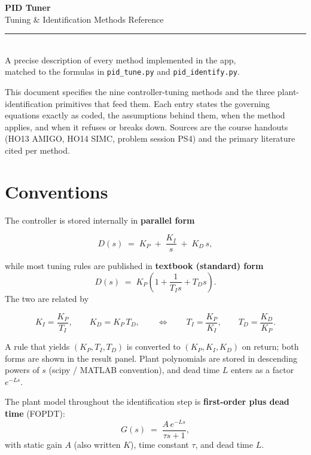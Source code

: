 \documentclass[11pt]{article}
\newcommand{\keybox}[1]{%
  \par\vspace{0.4em}%
  \noindent\colorbox{boxbg}{%
    \begin{minipage}{\dimexpr\linewidth-2\fboxsep\relax}%
      \vspace{0.3em}#1\vspace{0.3em}%
    \end{minipage}}%
  \par\vspace{0.4em}%
}
\begin{document}
\begin{center}
  {\huge\bfseries\color{accent} PID Tuner}\\[0.3em]
  {\Large Tuning \& Identification Methods Reference}\\[0.8em]
  {\color{rulegray}\rule{0.5\linewidth}{0.4pt}}\\[0.6em]
  {\normalsize A precise description of every method implemented in the app,}\\
  {\normalsize matched to the formulas in \texttt{pid_tune.py} and \texttt{pid_identify.py}.}\\[0.4em]
\end{center}

\vspace{0.5em}

This document specifies the nine controller-tuning methods and the three
plant-identification primitives that feed them. Each entry states the
governing equations exactly as coded, the assumptions behind them, when the
method applies, and when it refuses or breaks down. Sources are the course
handouts (HO13 AMIGO, HO14 SIMC, problem session PS4) and the primary
literature cited per method.

\tableofcontents

\section{Conventions}

The controller is stored internally in \textbf{parallel form}
\keybox{\[
  D(s) \;=\; K_P \;+\; \frac{K_I}{s} \;+\; K_D\, s ,
\]}
while most tuning rules are published in \textbf{textbook (standard) form}
\[
  D(s) \;=\; K_P\!\left(1 + \frac{1}{T_I s} + T_D s\right).
\]
The two are related by
\keybox{\[
  K_I = \frac{K_P}{T_I}, \qquad K_D = K_P\, T_D ,
  \qquad\Longleftrightarrow\qquad
  T_I = \frac{K_P}{K_I}, \qquad T_D = \frac{K_D}{K_P}.
\]}
A rule that yields $(K_P, T_I, T_D)$ is converted to $(K_P, K_I, K_D)$ on
return; both forms are shown in the result panel. Plant polynomials are stored
in descending powers of $s$ (scipy / MATLAB convention), and dead time $L$
enters as a factor $e^{-Ls}$.

The plant model throughout the identification step is
\textbf{first-order plus dead time} (FOPDT):
\[
  G(s) \;=\; \frac{A\, e^{-Ls}}{\tau s + 1},
\]
with static gain $A$ (also written $K$), time constant $\tau$, and dead
time $L$.
\end{document}
